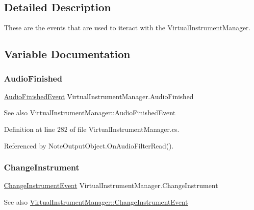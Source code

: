 \subsection{Detailed Description}
These are the events that are used to iteract with the \hyperlink{class_virtual_instrument_manager}{Virtual\+Instrument\+Manager}. 

\subsection{Variable Documentation}
\mbox{\label{group___v_i_m_events_ga39ffa8215ab5c9ad46c563e2bd87c219}} 
\subsubsection{\texorpdfstring{Audio\+Finished}{AudioFinished}}
{\footnotesize\ttfamily \hyperlink{group___v_i_m_event_types_class_virtual_instrument_manager_1_1_audio_finished_event}{Audio\+Finished\+Event} Virtual\+Instrument\+Manager.\+Audio\+Finished}

\begin{DoxySeeAlso}{See also}
\hyperlink{group___v_i_m_event_types_class_virtual_instrument_manager_1_1_audio_finished_event}{Virtual\+Instrument\+Manager\+::\+Audio\+Finished\+Event} 
\end{DoxySeeAlso}


Definition at line 282 of file Virtual\+Instrument\+Manager.\+cs.



Referenced by Note\+Output\+Object.\+On\+Audio\+Filter\+Read().

\mbox{\label{group___v_i_m_events_ga1b9f12a73a5418ea5695d38b78c506c4}} 
\subsubsection{\texorpdfstring{Change\+Instrument}{ChangeInstrument}}
{\footnotesize\ttfamily \hyperlink{group___v_i_m_event_types_class_virtual_instrument_manager_1_1_change_instrument_event}{Change\+Instrument\+Event} Virtual\+Instrument\+Manager.\+Change\+Instrument}

\begin{DoxySeeAlso}{See also}
\hyperlink{group___v_i_m_event_types_class_virtual_instrument_manager_1_1_change_instrument_event}{Virtual\+Instrument\+Manager\+::\+Change\+Instrument\+Event} 
\end{DoxySeeAlso}


